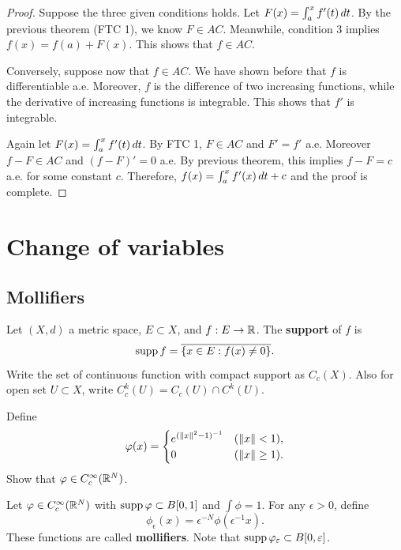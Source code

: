 \documentclass[a4paper]{article}
\begin{document}
\begin{proof}
  Suppose the three given conditions holds. Let $F(x) = \int_a^x f'(t) \, d
    t$. By the previous theorem (FTC 1), we know $F \in AC$. Meanwhile,
  condition 3 implies $f(x) = f(a) + F(x)$. This shows that $f \in AC$.

  Conversely, suppose now that $f \in AC$. We have shown before that $f$
  is differentiable a.e. Moreover, $f$ is the difference of two increasing
  functions, while the derivative of increasing functions is integrable.
  This shows that $f'$ is integrable.

  Again let $F(x) = \int_a^x f'(t) \, d t$. By FTC 1, $F \in AC$ and $F' =
  f'$ a.e. Moreover $f - F \in AC$ and $(f - F)' = 0$ a.e. By previous
  theorem, this implies $f - F = c$ a.e. for some constant $c$. Therefore,
  $f(x) = \int_a^x f'(x) \, d t + c$ and the proof is complete.
\end{proof}

\section{Change of variables}

\subsection{Mollifiers}

\begin{defi}[support]
  Let $(X, d)$ a metric space, $E \subset X$, and $f : E \to \mathbb{R}$. The
  \textbf{support} of $f$ is
  \[
    \operatorname{supp} f = \overline{\{ x \in E : f(x) \neq 0 \}}.
  \]
  Write the set of continuous function with compact support as $C_c (X)$.
  Also for open set $U \subset X$, write $C_c^k (U) = C_c(U) \cap C^k
  (U)$.
\end{defi}

\begin{ex}
  Define
  \[
    \varphi(x) = \begin{cases}
      e^{(\left\lVert x\right\rVert^2 - 1)^{-1}} & (\left\lVert x\right\rVert < 1),    \\
      0                         & (\left\lVert x\right\rVert \geq 1).
    \end{cases}
  \]
  Show that $\varphi \in C_c^\infty(\mathbb{R}^N)$.
\end{ex}

\begin{defi}[mollifier]
  Let $\varphi \in C_c^\infty (\mathbb{R}^N)$ with $\operatorname{supp} \varphi \subset B[0, 1]$ and
  $\int \phi = 1$. For any $\epsilon > 0$, define
  \[
    \phi_\epsilon (x) = \epsilon^{-N} \phi(\epsilon^{-1} x).
  \]
  These functions are called \textbf{mollifiers}. Note that $\operatorname{supp}
  \varphi_\varepsilon \subset B[0, \varepsilon]$.
\end{defi}
\end{document}
